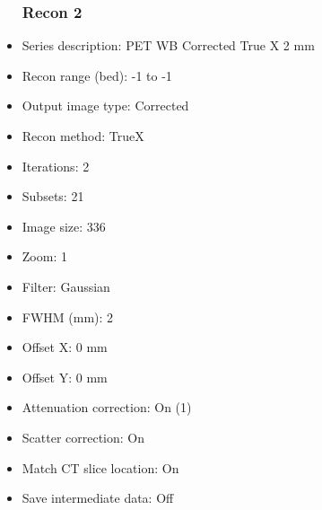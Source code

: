 \documentclass[12pt]{article}
\begin{document}
\begin{itemize}[noitemsep]
\subsubsection{Recon 2}
\item Series description: PET WB Corrected True X 2 mm
\item Recon range (bed): -1 to -1
\item Output image type: Corrected
\item Recon method: TrueX
\item Iterations: 2
\item Subsets: 21
\item Image size: 336
\item Zoom: 1
\item Filter: Gaussian
\item FWHM (mm): 2
\item Offset X: 0 mm
\item Offset Y: 0 mm
\item Attenuation correction: On (1)
\item Scatter correction: On
\item Match CT slice location: On
\item Save intermediate data: Off
\end{itemize}
\end{document}
